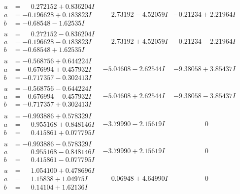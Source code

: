 \documentclass[1p]{elsarticle_modified}
\theoremstyle{definition}
\begin{document}
$$\begin{array}{c|c|c}
\begin{aligned}
u &= \phantom{-}0.272152 + 0.836204 I \\
a &= -0.196628 + 0.183823 I \\
b &= -0.68548 - 1.62535 I\end{aligned}
 & \phantom{-}2.73192 - 4.52059 I & -0.21234 + 2.21964 I \\ \hline\begin{aligned}
u &= \phantom{-}0.272152 - 0.836204 I \\
a &= -0.196628 - 0.183823 I \\
b &= -0.68548 + 1.62535 I\end{aligned}
 & \phantom{-}2.73192 + 4.52059 I & -0.21234 - 2.21964 I \\ \hline\begin{aligned}
u &= -0.568756 + 0.644224 I \\
a &= -0.676994 + 0.457932 I \\
b &= -0.717357 - 0.302413 I\end{aligned}
 & -5.04608 - 2.62544 I & -9.38058 + 3.85437 I \\ \hline\begin{aligned}
u &= -0.568756 - 0.644224 I \\
a &= -0.676994 - 0.457932 I \\
b &= -0.717357 + 0.302413 I\end{aligned}
 & -5.04608 + 2.62544 I & -9.38058 - 3.85437 I \\ \hline\begin{aligned}
u &= -0.993886 + 0.578329 I \\
a &= \phantom{-}0.955168 + 0.848146 I \\
b &= \phantom{-}0.415861 + 0.077795 I\end{aligned}
 & -3.79990 - 2.15619 I & \phantom{-0.000000 } 0 \\ \hline\begin{aligned}
u &= -0.993886 - 0.578329 I \\
a &= \phantom{-}0.955168 - 0.848146 I \\
b &= \phantom{-}0.415861 - 0.077795 I\end{aligned}
 & -3.79990 + 2.15619 I & \phantom{-0.000000 } 0 \\ \hline\begin{aligned}
u &= \phantom{-}1.054100 + 0.478696 I \\
a &= \phantom{-}1.15838 + 1.04975 I \\
b &= \phantom{-}0.14104 + 1.62136 I\end{aligned}
 & \phantom{-}0.06948 + 4.64990 I & \phantom{-0.000000 } 0 \\ \hline\begin{aligned}

\end{aligned}
\end{array}$$
\end{document}
